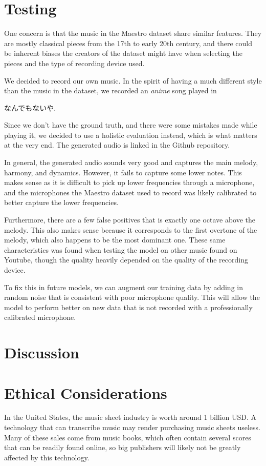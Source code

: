 \documentclass[a4paper,twocolumn,10pt]{article}
\begin{document}
\section{Testing}
One concern is that the music in the Maestro dataset share similar features. They are mostly classical pieces from the 17th to early 20th century\cite{maestro}, and there could be inherent biases the creators of the dataset might have when selecting the pieces and the type of recording device used.

We decided to record our own music. In the spirit of having a much different style than the music in the dataset, we recorded an \textit{anime} song played in \begin{CJK}{UTF8}{min}なんでもないや.\end{CJK}

Since we don't have the ground truth, and there were some mistakes made while playing it, we decided to use a holistic evaluation instead, which is what matters at the very end. The generated audio is linked in the Github repository.

In general, the generated audio sounds very good and captures the main melody, harmony, and dynamics. However, it fails to capture some lower notes. This makes sense as it is difficult to pick up lower frequencies through a microphone, and the microphones the Maestro dataset used to record was likely calibrated to better capture the lower frequencies.

Furthermore, there are a few false positives that is exactly one octave above the melody. This also makes sense because it corresponds to the first overtone of the melody, which also happens to be the most dominant one. These same characteristics was found when testing the model on other music found on Youtube, though the quality heavily depended on the quality of the recording device.

To fix this in future models, we can augment our training data by adding in random noise that is consistent with poor microphone quality. This will allow the model to perform better on new data that is not recorded with a professionally calibrated microphone.
\section{Discussion}
\section{Ethical Considerations}
In the United States, the music sheet industry is worth around 1 billion USD\cite{musicspoke}. A technology that can transcribe music may render purchasing music sheets useless. Many of these sales come from music books, which often contain several scores that can be readily found online, so big publishers will likely not be greatly affected by this technology.
\end{document}
